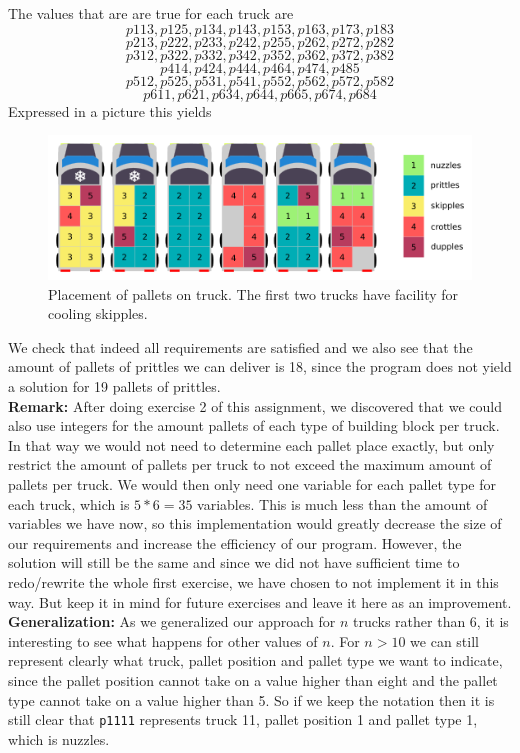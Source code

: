 \documentclass[a4paper]{article}
\begin{document}
The values that are are true for each truck are 
\[p113, p125, p134, p143, p153, p163, p173, p183 \]
\[p213, p222, p233, p242, p255, p262, p272, p282 \]
\[p312, p322, p332, p342, p352, p362, p372, p382 \]
\[p414, p424, p444, p464, p474, p485 \]
\[p512, p525, p531, p541, p552, p562, p572, p582 \]
\[p611, p621, p634, p644, p665, p674, p684 \]
Expressed in a picture this yields

\begin{figure}[H]
			\centering
				\includegraphics[scale=1]{trucks-2.png}
			\caption{Placement of pallets on truck. The first two trucks have facility for cooling skipples.}
		\end{figure}

We check that indeed all requirements are satisfied and we also see that the amount of pallets of prittles we can deliver is 18, since the program does not yield a solution for 19 pallets of prittles.\\

{\bf Remark:}
After doing exercise 2 of this assignment, we discovered that we could also use integers for the amount pallets of each type of building block per truck. In that way we would not need to determine each pallet place exactly, but only restrict the amount of pallets per truck to not exceed the maximum amount of pallets per truck. We would then only need one variable for each pallet type for each truck, which is $5*6=35$ variables. This is much less than the amount of variables we have now, so this implementation would greatly decrease the size of our requirements and increase the efficiency of our program. However, the solution will still be the same and since we did not have sufficient time to redo/rewrite the whole first exercise, we have chosen to not implement it in this way. But keep it in mind for future exercises and leave it here as an improvement.\\

{\bf Generalization:} 
As we generalized our approach for $n$ trucks rather than 6, it is interesting to see what happens for other values of $n$. For $n > 10$ we can still represent clearly what truck, pallet position and pallet type we want to indicate, since the pallet position cannot take on a value higher than eight and the pallet type cannot take on a value higher than 5. So if we keep the notation then it is still clear that {\tt p1111} represents truck 11, pallet position 1 and pallet type 1, which is nuzzles.
\end{document}
